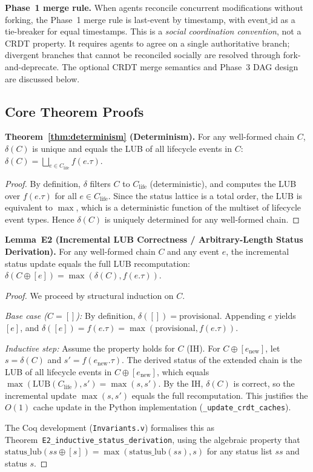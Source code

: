 \textbf{Phase~1 merge rule.} When agents reconcile concurrent modifications without forking, the Phase~1 merge rule is last-event by timestamp, with $\text{event\_id}$ as a tie-breaker for equal timestamps. This is a \emph{social coordination convention}, not a CRDT property. It requires agents to agree on a single authoritative branch; divergent branches that cannot be reconciled socially are resolved through fork-and-deprecate. The optional CRDT merge semantics and Phase~3 DAG design are discussed below.

\subsection{Core Theorem Proofs}

\textbf{Theorem~\ref{thm:determinism} (Determinism).} For any well-formed chain $C$, $\delta(C)$ is unique and equals the LUB of all lifecycle events in $C$: $\delta(C) = \bigsqcup_{e \in C_{\text{life}}} f(e.\tau)$.
\begin{proof}
By definition, $\delta$ filters $C$ to $C_{\text{life}}$ (deterministic), and computes the LUB over $f(e.\tau)$ for all $e \in C_{\text{life}}$. Since the status lattice is a total order, the LUB is equivalent to $\max$, which is a deterministic function of the multiset of lifecycle event types. Hence $\delta(C)$ is uniquely determined for any well-formed chain.
\end{proof}

\textbf{Lemma~E2 (Incremental LUB Correctness / Arbitrary-Length Status Derivation).} For any well-formed chain $C$ and any event $e$, the incremental status update equals the full LUB recomputation: $\delta(C \oplus [e]) = \max(\delta(C), f(e.\tau))$.
\begin{proof}
We proceed by structural induction on $C$.

\textit{Base case ($C = []$):} By definition, $\delta([]) = \text{provisional}$. Appending $e$ yields $[e]$, and $\delta([e]) = f(e.\tau) = \max(\text{provisional}, f(e.\tau))$.

\textit{Inductive step:} Assume the property holds for $C$ (IH). For $C \oplus [e_{\text{new}}]$, let $s = \delta(C)$ and $s' = f(e_{\text{new}}.\tau)$. The derived status of the extended chain is the LUB of all lifecycle events in $C \oplus [e_{\text{new}}]$, which equals $\max(\text{LUB}(C_{\text{life}}), s') = \max(s, s')$. By the IH, $\delta(C)$ is correct, so the incremental update $\max(s, s')$ equals the full recomputation. This justifies the $O(1)$ cache update in the Python implementation (\texttt{\_update\_crdt\_caches}).

The Coq development (\texttt{Invariants.v}) formalises this as Theorem~\texttt{E2\_inductive\_status\_derivation}, using the algebraic property that $\text{status\_lub}(ss \oplus [s]) = \max(\text{status\_lub}(ss), s)$ for any status list $ss$ and status $s$.
\end{proof}

